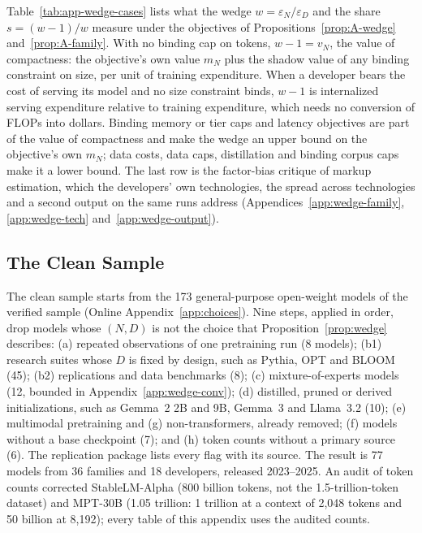 Table~\ref{tab:app-wedge-cases} lists what the wedge $w=\varepsilon_N/\varepsilon_D$ and the share $s=(w-1)/w$ measure
under the objectives of Propositions~\ref{prop:A-wedge} and~\ref{prop:A-family}. With no binding cap on tokens,
$w-1=v_N$, the value of compactness: the objective's own value $m_N$ plus the shadow value of any binding constraint on
size, per unit of training expenditure. When a developer bears the cost of serving its model and no size constraint
binds, $w-1$ is internalized serving expenditure relative to training expenditure, which needs no conversion of FLOPs
into dollars. Binding memory or tier caps and latency objectives are part of the value of compactness and make the wedge
an upper bound on the objective's own $m_N$; data costs, data caps, distillation and binding corpus caps make it a lower
bound. The last row is the factor-bias critique of markup estimation, which the developers' own technologies, the spread
across technologies and a second output on the same runs address (Appendices~\ref{app:wedge-family},
\ref{app:wedge-tech} and~\ref{app:wedge-output}).



\subsection{The Clean Sample}\label{app:wedge-sample}

The clean sample starts from the 173 general-purpose open-weight models of the verified sample (Online
Appendix~\ref{app:choices}). Nine steps, applied in order, drop models whose $(N,D)$ is not the choice that
Proposition~\ref{prop:wedge} describes: (a) repeated observations of one pretraining run (8 models); (b1) research suites
whose $D$ is fixed by design, such as Pythia, OPT and BLOOM (45); (b2) replications and data benchmarks (8); (c)
mixture-of-experts models (12, bounded in Appendix~\ref{app:wedge-conv}); (d) distilled, pruned or derived
initializations, such as Gemma~2 2B and 9B, Gemma~3 and Llama~3.2 (10); (e) multimodal pretraining and (g)
non-transformers, already removed; (f) models without a base checkpoint (7); and (h) token counts without a primary
source (6). The replication package lists every flag with its source. The result is 77 models from 36 families and 18
developers, released 2023--2025. An audit of token counts corrected StableLM-Alpha (800 billion tokens, not the
1.5-trillion-token dataset) and MPT-30B (1.05 trillion: 1 trillion at a context of 2,048 tokens and 50 billion at 8,192);
every table of this appendix uses the audited counts.

